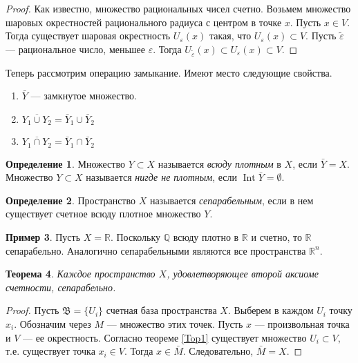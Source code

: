 \documentclass[12pt, titlepage, oneside]{amsbook}
\newcommand{\Int}{\operatorname{Int}}
\newcommand{\RR}{\mathbb{R}}
\newcommand{\QQ}{\mathbb{Q}}
\newcommand{\BBB}{\mathfrak{B}}
\newtheorem{theorem}{Теорема}[chapter]
\theoremstyle{definition}
\newtheorem{example}[theorem]{Пример}
\newtheorem{definition}[theorem]{Определение}
\theoremstyle{remark}
\begin{document}
\begin{proof}
Как известно, множество рациональных чисел счетно. Возьмем множество шаровых окрестностей рационального радиуса с центром в точке $x$. Пусть $x\in V$. Тогда существует шаровая окрестность $U_{\varepsilon}(x)$ такая, что $U_{\varepsilon}(x)\subset V$. Пусть $\tilde{\varepsilon}$ --- рациональное число, меньшее $\varepsilon$. Тогда $U_{\tilde{\varepsilon}}(x)\subset U_{\varepsilon}(x)\subset V$.
\end{proof}

Теперь рассмотрим операцию замыкание. Имеют место следующие свойства.
\begin{enumerate}
\item $\bar{Y}$ --- замкнутое множество.
\item $\overline{Y_1\cup Y_2}=\bar{Y}_1\cup\bar{Y}_2$
\item $\overline{Y_1\cap Y_2}=\bar{Y}_1\cap\bar{Y}_2$
\end{enumerate}

\begin{definition}
Множество $Y\subset X$ называется \emph{всюду плотным} в $X$, если $\bar{Y}=X$. Множество $Y\subset X$ называется \emph{нигде не плотным}, если $\Int\bar{Y}=\emptyset$.
\end{definition}

\begin{definition}
Пространство $X$ называется \emph{сепарабельным}, если в нем существует счетное всюду плотное множество $Y$.
\end{definition}

\begin{example}
Пусть $X=\RR$. Поскольку $\QQ$ всюду плотно в $\RR$ и счетно, то $\RR$ сепарабельно. Аналогично сепарабельными являются все пространства $\RR^n$.
\end{example}

 \begin{theorem}
\label{Met7}
Каждое пространство $X$, удовлетворяющее второй аксиоме счетности, сепарабельно.
\end{theorem}

\begin{proof}
Пусть $\BBB=\{U_i\}$ счетная база пространства $X$. Выберем в каждом $U_i$ точку $x_i$. Обозначим через $M$ --- множество этих точек. Пусть $x$ --- произвольная точка и $V$ --- ее окрестность. Согласно теореме \ref{Top1} существует множество $U_i\subset V$, т.е. существует точка $x_i\in V$. Тогда $x\in\bar{M}$. Следовательно, $\bar{M}=X$.
\end{proof}
\end{document}
